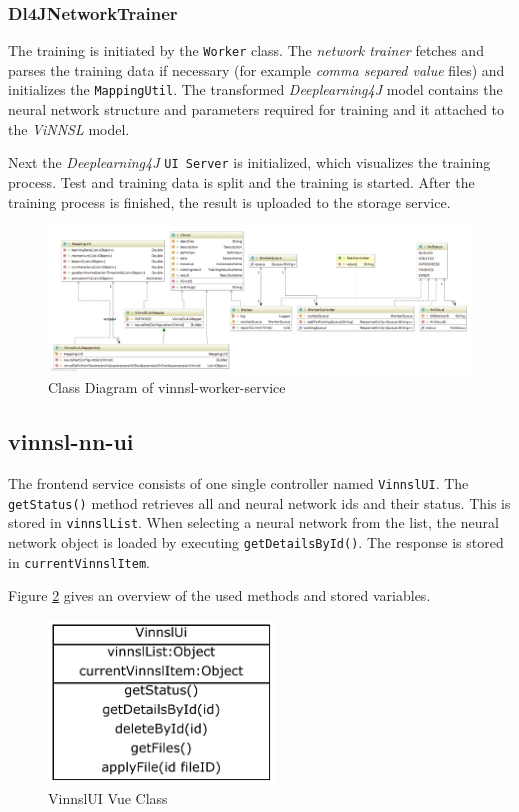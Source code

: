 \subsubsection{Dl4JNetworkTrainer}\label{dl4jnetworktrainer}

The training is initiated by the \texttt{Worker} class. The
\emph{network trainer} fetches and parses the training data if necessary
(for example \emph{comma separed value} files) and initializes the
\texttt{MappingUtil}. The transformed \emph{Deeplearning4J} model
contains the neural network structure and parameters required for
training and it attached to the \emph{ViNNSL} model.

Next the \emph{Deeplearning4J} \texttt{UI\ Server} is initialized, which
visualizes the training process. Test and training data is split and the
training is started. After the training process is finished, the result
is uploaded to the storage service.

\begin{figure}
\centering
\includegraphics[width=17.00000cm]{images/uml-class-diagram-vinnsl-worker-service}
\caption{Class Diagram of vinnsl-worker-service
\label{class_vinnsl-worker-service}}
\end{figure}

\subsection{vinnsl-nn-ui}\label{vinnsl-nn-ui}

The frontend service consists of one single controller named
\texttt{VinnslUI}. The \texttt{getStatus()} method retrieves all and
neural network ids and their status. This is stored in
\texttt{vinnslList}. When selecting a neural network from the list, the
neural network object is loaded by executing \texttt{getDetailsById()}.
The response is stored in \texttt{currentVinnslItem}.

Figure \ref{vinnsl-nn-ui_class} gives an overview of the used methods
and stored variables.

\begin{figure}
\centering
\includegraphics[width=6.00000cm]{images/vinnsl-nn-ui_class}
\caption{VinnslUI Vue Class \label{vinnsl-nn-ui_class}}
\end{figure}

